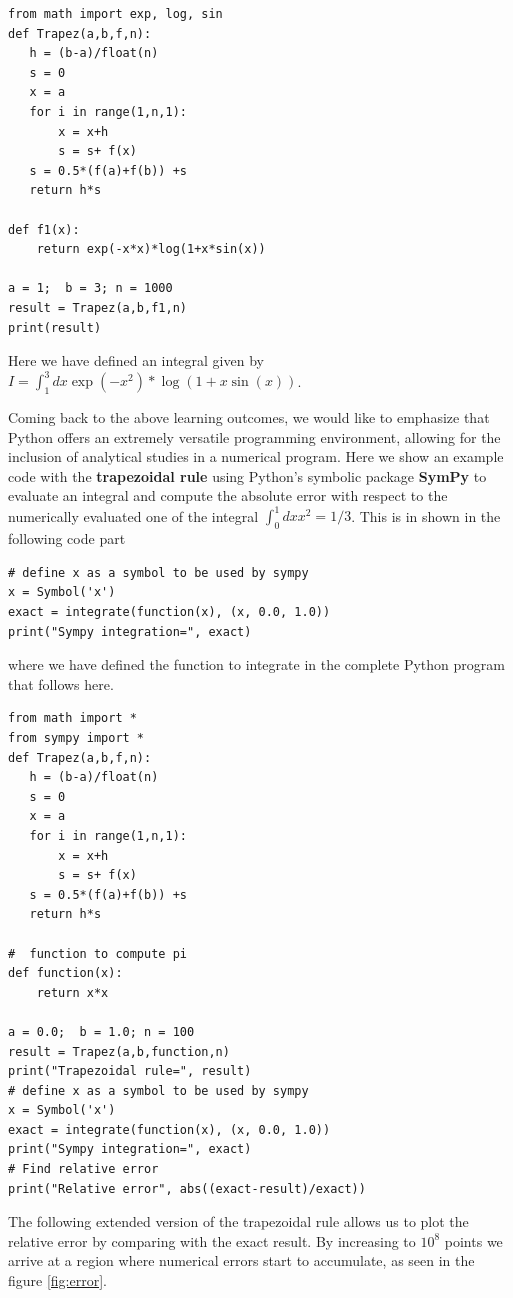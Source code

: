 \documentclass[graybox,envcountchap,sectrefs]{svmult}
\begin{document}
\begin{lstlisting}
from math import exp, log, sin
def Trapez(a,b,f,n):
   h = (b-a)/float(n)
   s = 0
   x = a
   for i in range(1,n,1):
       x = x+h
       s = s+ f(x)
   s = 0.5*(f(a)+f(b)) +s
   return h*s

def f1(x):
    return exp(-x*x)*log(1+x*sin(x))

a = 1;  b = 3; n = 1000
result = Trapez(a,b,f1,n)
print(result)
\end{lstlisting}
Here we have defined an integral given by $I=\int_1^3 dx \exp{(-x^2)}*\log{(1+x\sin{(x)})}$.

Coming back to the above learning outcomes, we would like to emphasize that
Python offers an  extremely versatile programming  environment, allowing for
the inclusion of analytical studies in a numerical program. Here we show an
example code with the \textbf{trapezoidal rule} using Python's symbolic package \textbf{SymPy} \cite{SymPy} to evaluate an integral and compute the absolute error
with respect to the numerically evaluated one of the integral
$\int_0^1 dx x^2 = 1/3$. This is in shown in the following code part
\begin{lstlisting}
# define x as a symbol to be used by sympy
x = Symbol('x')
exact = integrate(function(x), (x, 0.0, 1.0))
print("Sympy integration=", exact)
\end{lstlisting}
where we have defined the function to integrate in
the complete Python program that follows here.
\begin{lstlisting}
from math import *
from sympy import *
def Trapez(a,b,f,n):
   h = (b-a)/float(n)
   s = 0
   x = a
   for i in range(1,n,1):
       x = x+h
       s = s+ f(x)
   s = 0.5*(f(a)+f(b)) +s
   return h*s

#  function to compute pi
def function(x):
    return x*x

a = 0.0;  b = 1.0; n = 100
result = Trapez(a,b,function,n)
print("Trapezoidal rule=", result)
# define x as a symbol to be used by sympy
x = Symbol('x')
exact = integrate(function(x), (x, 0.0, 1.0))
print("Sympy integration=", exact)
# Find relative error
print("Relative error", abs((exact-result)/exact))
\end{lstlisting}
The following extended version of the trapezoidal rule allows us to
plot the relative error by comparing with the exact result. By
increasing to $10^8$ points we arrive at a region where numerical
errors start to accumulate, as seen in the figure \ref{fig:error}.
\end{document}
